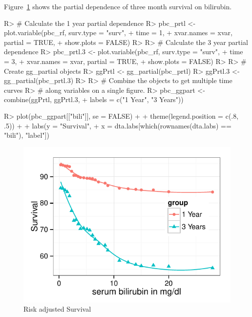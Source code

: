 \documentclass[nojss]{jss}\usepackage[]{graphicx}\usepackage[]{color}
\makeatletter
\def\maxwidth{ %
  \ifdim\Gin@nat@width>\linewidth
    \linewidth
  \else
    \Gin@nat@width
  \fi
}
\makeatother
\begin{document}
Figure~\ref{fig:pbc-partial-bili} shows the partial dependence of three month survival on bilirubin. 

\begin{Schunk}
\begin{Sinput}
R> # Calculate the 1 year partial dependence
R> pbc_prtl <- plot.variable(pbc_rf, surv.type = "surv", 
+                           time = 1, 
+                           xvar.names = xvar, partial = TRUE, 
+                           show.plots = FALSE)
R> 
R> # Calculate the 3 year partial dependence
R> pbc_prtl.3 <- plot.variable(pbc_rf, surv.type = "surv", 
+                             time = 3, 
+                             xvar.names = xvar, partial = TRUE, 
+                             show.plots = FALSE)
R> 
R> # Create gg_partial objects
R> ggPrtl <- gg_partial(pbc_prtl)
R> ggPrtl.3 <- gg_partial(pbc_prtl.3)
R> 
R> # Combine the objects to get multiple time curves 
R> # along variables on a single figure.
R> pbc_ggpart <- combine(ggPrtl, ggPrtl.3, 
+                       labels = c("1 Year", "3 Years"))
\end{Sinput}
\end{Schunk}




\begin{Schunk}
\begin{Sinput}
R> plot(pbc_ggpart[["bili"]], se = FALSE) + 
+   theme(legend.position = c(.8, .5)) + 
+   labs(y = "Survival", 
+        x = dta.labs[which(rownames(dta.labs) ==  "bili"), "label"])
\end{Sinput}
\begin{figure}[!htpb]

{\centering \includegraphics[width=\maxwidth]{figure/rfs-pbc-partial-bili-1} 

}

\caption[Risk adjusted Survival]{Risk adjusted Survival\label{fig:pbc-partial-bili}}
\end{figure}
\end{Schunk}
\end{document}
